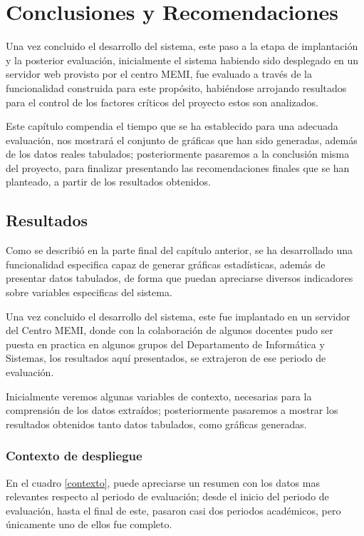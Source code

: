 \chapter{Conclusiones y Recomendaciones}

Una vez concluido el desarrollo del sistema, este paso a la etapa de
implantación y la posterior evaluación, inicialmente el sistema habiendo sido
desplegado en un servidor web provisto por el centro MEMI, fue evaluado a través
de la funcionalidad construida para este propósito, habiéndose arrojando
resultados para el control de los factores críticos del proyecto estos son
analizados.

Este capítulo compendia el tiempo que se ha establecido para una adecuada
evaluación, nos mostrará el conjunto de gráficas que han sido generadas, además
de los datos reales tabulados; posteriormente pasaremos a la conclusión misma
del proyecto, para finalizar presentando las recomendaciones finales que se han
planteado, a partir de los resultados obtenidos.

\section{Resultados}
Como se describió en la parte final del capítulo anterior, se ha desarrollado
una funcionalidad especifica capaz de generar gráficas estadísticas, además de
presentar datos tabulados, de forma que puedan apreciarse diversos indicadores
sobre variables especificas del sistema.

Una vez concluido el desarrollo del sistema, este fue implantado en un servidor
del Centro MEMI, donde con la colaboración de algunos docentes pudo ser puesta
en practica en algunos grupos del Departamento de Informática y Sistemas, los
resultados aquí presentados, se extrajeron de ese periodo  de evaluación.

Inicialmente veremos algunas variables de contexto, necesarias para la
comprensión de los datos extraídos; posteriormente pasaremos a mostrar los
resultados obtenidos tanto datos tabulados, como gráficas generadas.

\subsection{Contexto de despliegue}
En el cuadro \ref{contexto}, puede apreciarse un resumen con los datos mas
relevantes respecto al periodo de evaluación; desde el inicio del periodo de
evaluación, hasta el final de este, pasaron casi dos periodos académicos, pero
únicamente uno de ellos fue completo.

